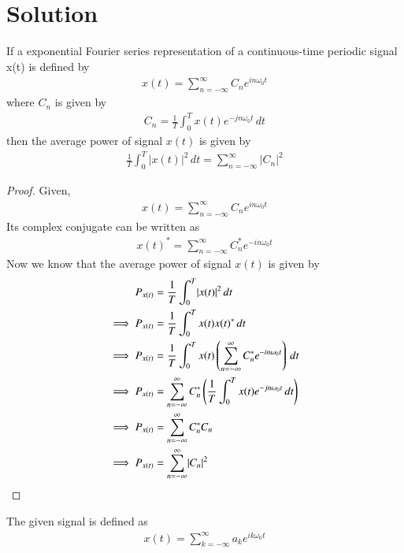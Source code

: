 \documentclass[journal,12pt,twocolumn]{IEEEtran}
\begin{document}
\section{Solution}
\begin{theorem}
If a exponential Fourier series representation of a continuous-time periodic signal x(t) is defined by 
\begin{align}
    x(t) = \sum_{n=-\infty}^{\infty}C_{n}e^{in\omega_0t}
\end{align}
where $C_n$ is given by
\begin{align}
    C_n = \frac{1}{T}\int_{0}^{T}x(t)e^{-jn\omega_0t}\,dt
\end{align}
then the average power of signal $x(t)$ is given by
\begin{align}
    \frac{1}{T}\int_{0}^{T}\lvert x(t)\rvert^2\,dt = \sum_{n=-\infty}^{\infty}\lvert C_n\rvert^2
\end{align}
\end{theorem}
\begin{proof}
Given,
\begin{align}
    x(t) = \sum_{n=-\infty}^{\infty}C_{n}e^{in\omega_0t}     
\end{align}
Its complex conjugate can be written as
\begin{align}
    x(t)^* = \sum_{n=-\infty}^{\infty}C_{n}^*e^{-in\omega_0t}
\end{align}
Now we know that the average power of signal $x(t)$ is given by
\begin{align}
    P_{x(t)}&=\frac{1}{T}\int_{0}^{T}\lvert x(t)\rvert^2\,dt\\
    \implies P_{x(t)} &= \frac{1}{T}\int_{0}^{T}x(t)x(t)^*\,dt\\
    \implies P_{x(t)} &= \frac{1}{T}\int_{0}^{T}x(t)\left(\sum_{n=-\infty}^{\infty}C_{n}^*e^{-in\omega_0t}\right)\,dt\\
    \implies P_{x(t)} &= \sum_{n=-\infty}^{\infty}C_{n}^*\left(\frac{1}{T}\int_{0}^{T}x(t)e^{-jn\omega_0t}\,dt\right)\\
    \implies P_{x(t)} &= \sum_{n=-\infty}^{\infty}C_{n}^*C_{n}\\
    \implies P_{x(t)} &= \sum_{n=-\infty}^{\infty}\lvert C_n\rvert^2
\end{align}
\end{proof}
The given signal is defined as 
\begin{align}
    x(t) = \sum_{k=-\infty}^{\infty}a_{k}e^{ik\omega_0t}
\end{align}
\end{document}
